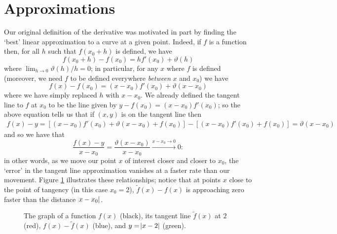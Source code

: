 \section{Approximations}
Our original definition of the derivative was motivated in part by finding the `best'
linear approximation to a curve at a given point. Indeed, if $ f $ is a function then,
for all $ h $ such that $ f(x_0 + h) $ is defined, we have
\begin{displaymath}
  f(x_0 + h) - f(x_0) = h f'(x_0) + \vartheta(h)
\end{displaymath}
where $ \lim_{h \to 0} \vartheta(h)/h = 0 $; in particular, for any $ x $ where $ f $
is defined (moreover, we need $ f $ to be defined everywhere \emph{between} $ x $ and $ x_0 $)
we have
\begin{displaymath}
  f(x) - f(x_0) = (x - x_0) f'(x_0) + \vartheta(x - x_0)
\end{displaymath}
where we have simply replaced $ h $ with $ x - x_0 $. We already defined the tangent
line to $ f $ at $ x_0 $ to be the line given by $ y - f(x_0) = (x - x_0) f'(x_0) $;
so the above equation tells us that if $ (x,y) $ is on the tangent line then
\begin{align*}
  f(x) - y = [(x - x_0) f'(x_0) + \vartheta(x - x_0) + f(x_0)] - [(x - x_0)f'(x_0) + f(x_0)] = \vartheta(x - x_0)
\end{align*}
and so we have that
\begin{displaymath}
  \frac{f(x) - y}{x - x_0} = \frac{\vartheta(x - x_0)}{x - x_0} \xrightarrow{x - x_0 \to 0} 0:
\end{displaymath}
in other words, as we move our point $ x $ of interest closer and closer to $ x_0 $, the `error' in
the tangent line approximation vanishes at a faster rate than our movement. Figure \ref{fig:approx1}
illustrates these relationships; notice that at points $ x $ close to the point of tangency (in this case $ x_0 = 2 $),
$ \tilde f(x) - f(x) $ is approaching zero faster than the distance $ \abs{x - x_0} $.

\begin{figure}
  \centering
  \caption{The graph of a function $ f(x) $ (black), its tangent line $ \tilde f(x) $ at $ 2 $ (red), $ f(x) - \tilde f(x) $ (blue), and $ y = \abs{x - 2} $ (green).\label{fig:approx1}}
\end{figure}

